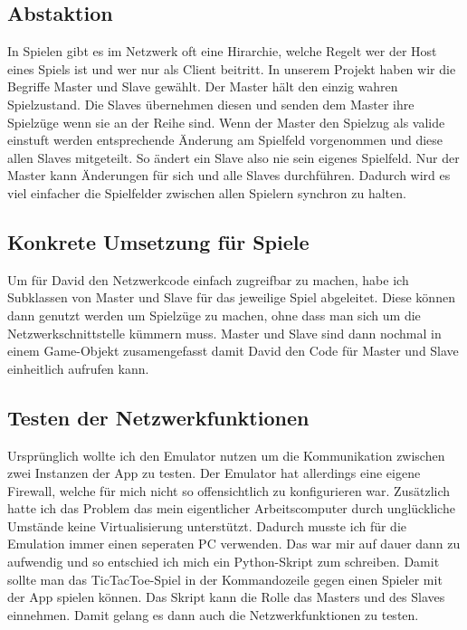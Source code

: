\subsection{Abstaktion}
In Spielen gibt es im Netzwerk oft eine Hirarchie, welche Regelt wer der Host eines Spiels ist und wer nur als Client beitritt.
In unserem Projekt haben wir die Begriffe Master und Slave gewählt.
Der Master hält den einzig wahren Spielzustand. Die Slaves übernehmen diesen und senden dem Master ihre Spielzüge wenn
sie an der Reihe sind. Wenn der Master den Spielzug als valide einstuft werden entsprechende Änderung
am Spielfeld vorgenommen und diese allen Slaves mitgeteilt.
So ändert ein Slave also nie sein eigenes Spielfeld. Nur der Master kann Änderungen für sich und alle Slaves durchführen.
Dadurch wird es viel einfacher die Spielfelder zwischen allen Spielern synchron zu halten.
\subsection{Konkrete Umsetzung für Spiele}
Um für David den Netzwerkcode einfach zugreifbar zu machen, habe ich Subklassen von Master und Slave für das jeweilige Spiel abgeleitet.
Diese können dann genutzt werden um Spielzüge zu machen, ohne dass man sich um die Netzwerkschnittstelle kümmern muss.
Master und Slave sind dann nochmal in einem Game-Objekt zusamengefasst damit David den Code für Master und Slave
einheitlich aufrufen kann.
\subsection{Testen der Netzwerkfunktionen}
Ursprünglich wollte ich den Emulator nutzen um die Kommunikation zwischen zwei Instanzen der App zu testen.
Der Emulator hat allerdings eine eigene Firewall, welche für mich nicht so offensichtlich zu konfigurieren war.
Zusätzlich hatte ich das Problem das mein eigentlicher Arbeitscomputer durch unglückliche Umstände keine Virtualisierung unterstützt.
Dadurch musste ich für die Emulation immer einen seperaten PC verwenden. Das war mir auf dauer dann zu aufwendig und so entschied ich mich
ein Python-Skript zum schreiben. Damit sollte man das TicTacToe-Spiel in der Kommandozeile gegen einen Spieler mit der App spielen können.
Das Skript kann die Rolle das Masters und des Slaves einnehmen. Damit gelang es dann auch die Netzwerkfunktionen zu testen.